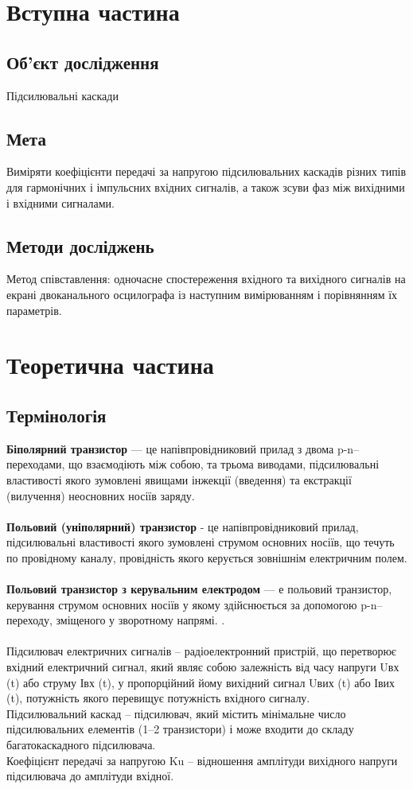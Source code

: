 \section{Вступна частина}
\subsection{Об'єкт дослідження}
\setlength{\parindent}{4em}
\indent Підсилювальні каскади
\subsection{Мета}
\indent Виміряти коефіцієнти передачі за напругою
підсилювальних каскадів різних типів для гармонічних і імпульсних
вхідних сигналів, а також зсуви фаз між вихідними і вхідними сигналами.


\subsection{Методи досліджень}
\indent Метод співставлення: одночасне спостереження
вхідного та вихідного сигналів на екрані двоканального осцилографа із
наступним вимірюванням і порівнянням їх параметрів.


\newpage
\section{Теоретична частина}
\subsection{Термінологія}
\indent \textbf{Біполярний транзистор } — це напівпровідниковий прилад з двома p-n–
переходами, що взаємодіють між собою, та трьома виводами, підсилювальні
властивості якого зумовлені явищами інжекції (введення) та екстракції
(вилучення) неосновних носіїв заряду.  \\~\\
\textbf{Польовий (уніполярний) транзистор} - це напівпровідниковий прилад,
підсилювальні властивості якого зумовлені струмом основних носіїв, що течуть
по провідному каналу, провідність якого керується зовнішнім електричним
полем.  \\~\\
\textbf{Польовий транзистор з керувальним електродом}  — е польовий транзистор,
керування струмом основних носіїв у якому здійснюється за допомогою p-n–
переходу, зміщеного у зворотному напрямі. . \\~\\
Підсилювач електричних сигналів – радіоелектронний пристрій, що перетворює
вхідний електричний сигнал, який являє собою залежність від часу напруги Uвх
(t) або струму Івх (t), у пропорційний йому вихідний сигнал Uвих (t) або Івих (t),
потужність якого перевищує потужність вхідного сигналу.\\
Підсилювальний каскад – підсилювач, який містить мінімальне число
підсилювальних елементів (1–2 транзистори) і може входити до складу
багатокаскадного підсилювача. \\
Коефіцієнт передачі за напругою Ku – відношення амплітуди вихідного напруги
підсилювача до амплітуди вхідної.
\newpage
